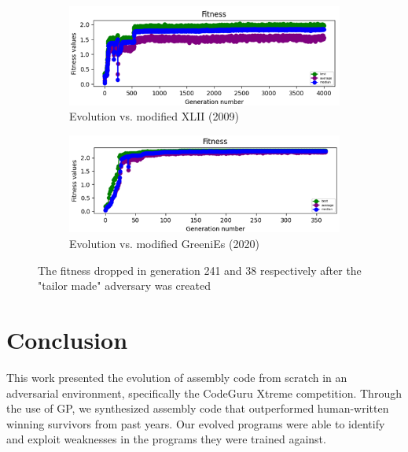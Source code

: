 \documentclass[dvipsnames, format=sigconf]{acmart}
\begin{document}
\begin{figure}
  \centering
  \begin{subfigure}{0.45\textwidth}
    \includegraphics[width=\linewidth]{images/xlii_antivirus.png}
    \caption{Evolution vs. modified XLII (2009)}
    \label{fig:antivirus1}
  \end{subfigure}
  \hfill
  \begin{subfigure}{0.45\textwidth}
    \includegraphics[width=\linewidth]{images/greenies_antivirus.png}
    \caption{Evolution vs. modified GreeniEs (2020)}
    \label{fig:antivirus2}
  \end{subfigure}
  \caption{The fitness dropped in generation 241 and 38 respectively after the "tailor made" adversary was created}
  \label{fig:antivirus}
\end{figure}


\section{Conclusion}
This work presented the evolution of assembly code from scratch in an adversarial environment, specifically the CodeGuru Xtreme competition. Through the use of GP, we synthesized assembly code that outperformed human-written winning survivors from past years. Our evolved programs were able to identify and exploit weaknesses in the programs they were trained against. %
\end{document}
